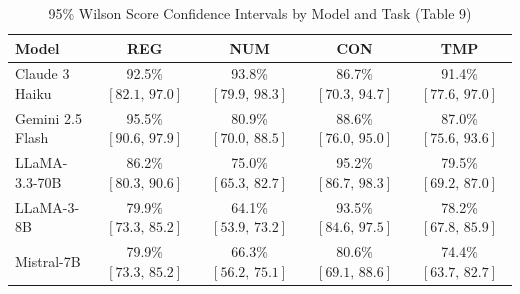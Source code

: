 \begin{table}[h]
\centering
\small
\caption{95\% Wilson Score Confidence Intervals by Model and Task (Table 9)}
\label{tab:wilson_ci}
\begin{tabular}{lcccc}
\toprule
Model & REG & NUM & CON & TMP \\
\midrule
Claude 3 Haiku & 92.5\% $[82.1,\,97.0]$ & 93.8\% $[79.9,\,98.3]$ & 86.7\% $[70.3,\,94.7]$ & 91.4\% $[77.6,\,97.0]$ \\
Gemini 2.5 Flash & 95.5\% $[90.6,\,97.9]$ & 80.9\% $[70.0,\,88.5]$ & 88.6\% $[76.0,\,95.0]$ & 87.0\% $[75.6,\,93.6]$ \\
LLaMA-3.3-70B & 86.2\% $[80.3,\,90.6]$ & 75.0\% $[65.3,\,82.7]$ & 95.2\% $[86.7,\,98.3]$ & 79.5\% $[69.2,\,87.0]$ \\
LLaMA-3-8B & 79.9\% $[73.3,\,85.2]$ & 64.1\% $[53.9,\,73.2]$ & 93.5\% $[84.6,\,97.5]$ & 78.2\% $[67.8,\,85.9]$ \\
Mistral-7B & 79.9\% $[73.3,\,85.2]$ & 66.3\% $[56.2,\,75.1]$ & 80.6\% $[69.1,\,88.6]$ & 74.4\% $[63.7,\,82.7]$ \\
\bottomrule
\end{tabular}
\end{table}
